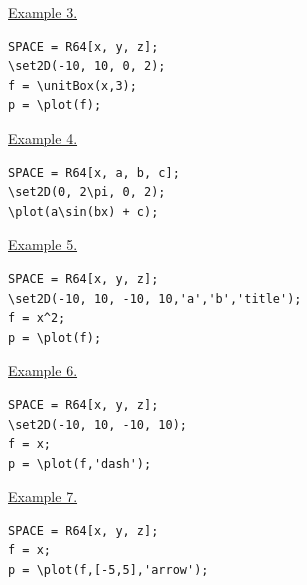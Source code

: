 \underline{Example 3. }


\begin{verbatim}
SPACE = R64[x, y, z];
\set2D(-10, 10, 0, 2);
f = \unitBox(x,3); 
p = \plot(f);
\end{verbatim}




\underline{Example 4. }


\begin{verbatim}
SPACE = R64[x, a, b, c];
\set2D(0, 2\pi, 0, 2);
\plot(a\sin(bx) + c);
\end{verbatim}


% 

\underline{Example 5. }
\vspace*{-2mm}
\begin{verbatim}
SPACE = R64[x, y, z];
\set2D(-10, 10, -10, 10,'a','b','title');
f = x^2; 
p = \plot(f);
\end{verbatim}
\vspace*{-2mm}

\underline{Example 6. }
\vspace*{-2mm}
\begin{verbatim}
SPACE = R64[x, y, z];
\set2D(-10, 10, -10, 10);
f = x; 
p = \plot(f,'dash');
\end{verbatim}
\vspace*{-2mm}

\underline{Example 7. }
\vspace*{-2mm}
\begin{verbatim}
SPACE = R64[x, y, z]; 
f = x; 
p = \plot(f,[-5,5],'arrow');
\end{verbatim}
\vspace*{-2mm}


